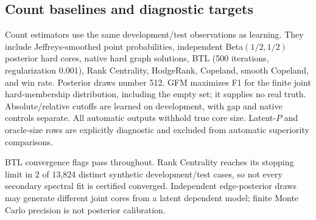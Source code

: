 \begin{table}[ht]\centering\small

\caption{STE structural readout on selective non-singleton targets only ($1<|C|<n$), with the original development-selected absolute cutoff. Metrics average the saved per-collection stratum means over twelve collections. Exact is complete-set recovery; selected and reference are mean cardinalities. These are inspected descriptive strata, not additional primary tests.}
\label{tab:selective-recovery}\end{table}

\subsection{Count baselines and diagnostic targets}
Count estimators use the same development/test observations as learning. They include Jeffreys-smoothed point probabilities, independent Beta$(1/2,1/2)$ posterior hard cores, native hard graph solutions, BTL (500 iterations, regularization 0.001), Rank Centrality, HodgeRank, Copeland, smooth Copeland, and win rate. Posterior draws number 512. GFM maximizes F1 for the finite joint hard-membership distribution, including the empty set; it supplies no real truth. Absolute/relative cutoffs are learned on development, with gap and native controls separate. All automatic outputs withhold true core size. Latent-$P$ and oracle-size rows are explicitly diagnostic and excluded from automatic superiority comparisons.

\begin{table}[ht]\centering\small

\caption{Count-only descriptive F1 using absolute development calibration; all-selected is native. RC is Rank Centrality. These observations are reused from the learning collections and do not form an independent confirmation.}
\label{tab:gpu-counts}\end{table}

BTL convergence flags pass throughout. Rank Centrality reaches its stopping limit in 2 of 13,824 distinct synthetic development/test cases, so not every secondary spectral fit is certified converged. Independent edge-posterior draws may generate different joint cores from a latent dependent model; finite Monte Carlo precision is not posterior calibration.

